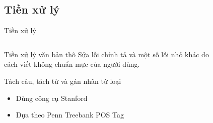 \documentclass[9pt,xcolor=table,hyperref=unicode]{beamer}
\begin{document}
	\subsection{Tiền xử lý}	
	\begin{frame}{Tiền xử lý}		
		\begin{columns}[t]
			\begin{column}{0.7\textwidth}				
			   	\begin{block}{Tiền xử lý văn bản thô}
	   				Sửa lỗi chính tả và một số lỗi nhỏ khác do cách viết không chuẩn mực của người dùng.
				\end{block}
				\begin{block}{Tách câu, tách từ và gán nhãn từ loại}
					\begin{itemize}			   		
		   				\item{Dùng công cụ Stanford \footnotemark}
		   				\item{Dựa theo Penn Treebank POS Tag \footnotemark}
		   			\end{itemize}
				\end{block}
			\end{column}
			\begin{column}{0.3\textwidth}  %
			 	\begin{figure}[H]
					\fontsize{13pt}{13}\selectfont 
					\centering				
					\resizebox{30mm}{!}{}	
				\end{figure}				
			\end{column}
		\end{columns}
		\begin{columns}[t]			
			\begin{column}{\textwidth}				
			   	\begin{figure}[H]
					\LARGE 
					\resizebox{100mm}{!}{}										
				\end{figure}
			\end{column}			
		\end{columns}
	\end{frame}
\end{document}
